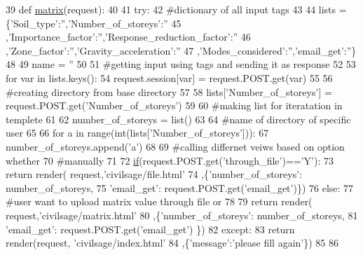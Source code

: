 \begin{DoxyCode}
39 \textcolor{keyword}{def }\hyperlink{namespacecivilsage_1_1views_a8b58c93a9c82e84143c43dafaa744a4b}{matrix}(request):
40 
41     \textcolor{keywordflow}{try}:
42         \textcolor{comment}{#dictionary of all input tags}
43         
44         lists = \{\textcolor{stringliteral}{'Soil\_type'}:\textcolor{stringliteral}{''},\textcolor{stringliteral}{'Number\_of\_storeys'}:\textcolor{stringliteral}{''}
45         ,\textcolor{stringliteral}{'Importance\_factor'}:\textcolor{stringliteral}{''},\textcolor{stringliteral}{'Response\_reduction\_factor'}:\textcolor{stringliteral}{''}
46         ,\textcolor{stringliteral}{'Zone\_factor'}:\textcolor{stringliteral}{''},\textcolor{stringliteral}{'Gravity\_acceleration'}:\textcolor{stringliteral}{''}
47         ,\textcolor{stringliteral}{'Modes\_considered'}:\textcolor{stringliteral}{''},\textcolor{stringliteral}{'email\_get'}:\textcolor{stringliteral}{''}\}
48 
49         name = \textcolor{stringliteral}{''}
50 
51         \textcolor{comment}{#getting input using tags and sending it as response}
52         
53         \textcolor{keywordflow}{for} var \textcolor{keywordflow}{in} lists.keys():
54             request.session[var] = request.POST.get(var)
55 
56         \textcolor{comment}{#creating directory from base directory}
57         
58         lists[\textcolor{stringliteral}{'Number\_of\_storeys'}] = request.POST.get(\textcolor{stringliteral}{'Number\_of\_storeys'})
59 
60         \textcolor{comment}{#making list for iteratation in templete}
61         
62         number\_of\_storeys = list()
63         
64         \textcolor{comment}{#name of directory of specific user}
65         
66         \textcolor{keywordflow}{for} a \textcolor{keywordflow}{in} range(int(lists[\textcolor{stringliteral}{'Number\_of\_storeys'}])):
67             number\_of\_storeys.append(\textcolor{stringliteral}{'a'})
68 
69         \textcolor{comment}{#calling differnet veiws based on option whether}
70         \textcolor{comment}{#manually}
71 
72         \hyperlink{bootstrap_8min_8js_ac2d69f5011896c6ed4a54e0dd36f6334}{if}(request.POST.get(\textcolor{stringliteral}{'through\_file'})==\textcolor{stringliteral}{'Y'}):
73             \textcolor{keywordflow}{return} render( request,\textcolor{stringliteral}{'civilsage/file.html'}
74             ,\{\textcolor{stringliteral}{'number\_of\_storeys'}: number\_of\_storeys,
75             \textcolor{stringliteral}{'email\_get'}: request.POST.get(\textcolor{stringliteral}{'email\_get'})\})
76         \textcolor{keywordflow}{else}:
77         \textcolor{comment}{#user want to upload matrix value through file or}
78         
79             \textcolor{keywordflow}{return} render( request,\textcolor{stringliteral}{'civilsage/matrix.html'}
80             ,\{\textcolor{stringliteral}{'number\_of\_storeys'}: number\_of\_storeys,
81             \textcolor{stringliteral}{'email\_get'}: request.POST.get(\textcolor{stringliteral}{'email\_get'}) \})
82     \textcolor{keywordflow}{except}:
83         \textcolor{keywordflow}{return} render(request, \textcolor{stringliteral}{'civilsage/index.html'}
84         ,\{\textcolor{stringliteral}{'message'}:\textcolor{stringliteral}{'please fill again'}\})
85 
86 
\end{DoxyCode}


